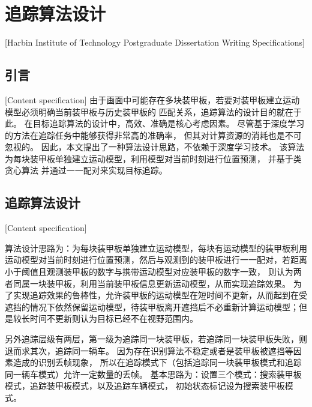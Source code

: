 

\chapter[追踪算法设计]{追踪算法设计}[Harbin Institute of Technology Postgraduate Dissertation Writing Specifications]

\section{引言}[Content specification]
由于画面中可能存在多块装甲板，若要对装甲板建立运动模型必须明确当前装甲板与历史装甲板的
匹配关系，追踪算法的设计目的就在于此。
在目标追踪算法的设计中，高效、准确是核心考虑因素。
尽管基于深度学习的方法在追踪任务中能够获得非常高的准确率，
但其对计算资源的消耗也是不可忽视的。
因此，本文提出了一种算法设计思路，不依赖于深度学习技术。
该算法为每块装甲板单独建立运动模型，利用模型对当前时刻进行位置预测，
并基于类贪心算法
并通过一一配对来实现目标追踪。

\section{追踪算法设计}[Content specification]

算法设计思路为：为每块装甲板单独建立运动模型，每块有运动模型的装甲板利用运动模型对当前时刻进行位置预测，然后与观测到的装甲板进行一一配对，若距离小于阈值且观测装甲板的数字与携带运动模型对应装甲板的数字一致，
则认为两者同属一块装甲板，利用当前装甲板信息更新运动模型，从而实现追踪效果。
为了实现追踪效果的鲁棒性，允许装甲板的运动模型在短时间不更新，从而起到在受遮挡的情况下依然保留运动模型，待装甲板离开遮挡后不必重新计算运动模型；但是较长时间不更新则认为目标已经不在视野范围内。
\par

另外追踪层级有两层，第一级为追踪同一块装甲板，若追踪同一块装甲板失败，则退而求其次，追踪同一辆车。
因为存在识别算法不稳定或者是装甲板被遮挡等因素造成的识别丢帧现象，
所以在追踪模式下（包括追踪同一块装甲板模式和追踪同一辆车模式）允许一定数量的丢帧。
基本思路为：设置三个模式：搜索装甲板模式，追踪装甲板模式，以及追踪车辆模式，
初始状态标记设为搜索装甲板模式。

